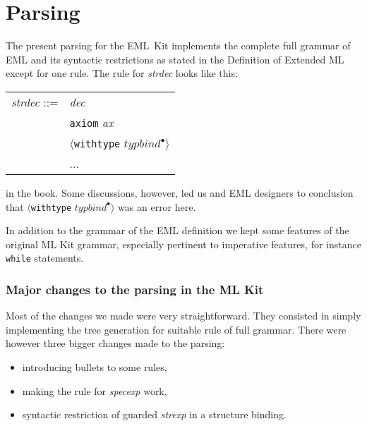 \part{Parsing}
\label{sec:parsing}

\newcommand{\letp}{{\tt let} }
\newcommand{\inp}{{\tt in} }
\newcommand{\pend}{{\tt end} }
\newcommand{\axiomp}{{\tt axiom} }
\newcommand{\wtypp}{{\tt withtype} }
\newcommand{\EMLK}{EML~Kit }



The present parsing for the \EMLK implements the complete full grammar
of EML and its syntactic restrictions as stated in the Definition of
Extended ML except for one rule. The rule for {\it strdec} looks like
this:

\begin{center}
\begin{tabular}[h]{ll}
{\it strdec} ::= & {\it dec}\\
                 & \axiomp {\it ax}\\
                 & \hspace{20pt} $\langle$\wtypp $typbind^\bullet \rangle$\\
                 & ...\\
\end{tabular}
\end{center}

\noindent in the book. Some discussions, however, led us and EML designers to
conclusion that $\langle$\wtypp $typbind^\bullet \rangle$ was an error
here.

In addition to the grammar of the EML definition we kept some features
of the original ML Kit grammar, especially pertinent to imperative
features, for instance {\tt while} statements.

\section{Major changes to the parsing in the ML Kit}
\label{sec:major}

Most of the changes we made were very straightforward. They consisted
in simply implementing the tree generation for suitable rule of full
grammar. There were however three bigger changes made to the parsing:
\begin{itemize}
\item introducing bullets to some rules,
\item making the rule for {\it specexp} work,
\item syntactic restriction of guarded {\it strexp} in a structure binding.
\end{itemize}

